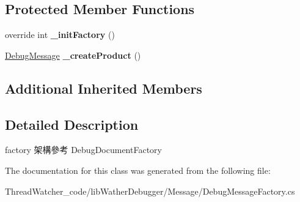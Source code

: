 \subsection*{Protected Member Functions}
\begin{DoxyCompactItemize}
\item 
\hypertarget{classlib_wather_debugger_1_1_message_1_1_debug_message_factory_aa37ca77e601cf30a724e33586fba5b82}{override int {\bfseries \+\_\+init\+Factory} ()}\label{classlib_wather_debugger_1_1_message_1_1_debug_message_factory_aa37ca77e601cf30a724e33586fba5b82}

\item 
\hypertarget{classlib_wather_debugger_1_1_message_1_1_debug_message_factory_a7ed5fc90ec47c4e3c8473b2b91dae84a}{\hyperlink{classlib_wather_debugger_1_1_message_1_1_debug_message}{Debug\+Message} {\bfseries \+\_\+create\+Product} ()}\label{classlib_wather_debugger_1_1_message_1_1_debug_message_factory_a7ed5fc90ec47c4e3c8473b2b91dae84a}

\end{DoxyCompactItemize}
\subsection*{Additional Inherited Members}


\subsection{Detailed Description}
factory 架構參考 Debug\+Document\+Factory 



The documentation for this class was generated from the following file\+:\begin{DoxyCompactItemize}
\item 
Thread\+Watcher\+\_\+code/lib\+Wather\+Debugger/\+Message/Debug\+Message\+Factory.\+cs\end{DoxyCompactItemize}

